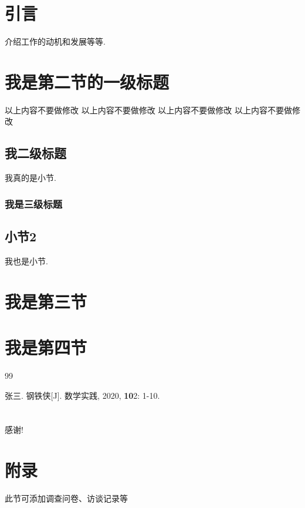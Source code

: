 \documentclass[a4paper,12pt,twoside]{ctexart}
\begin{document}
\newpage %
\pagestyle{empty}
\tableofcontents      %
\newpage %

\newpage
\section{引言}
    介绍工作的动机和发展等等.
\section{我是第二节的一级标题}
以上内容不要做修改 以上内容不要做修改 以上内容不要做修改 以上内容不要做修改
\subsection{我二级标题}
    我真的是小节.
\subsubsection{我是三级标题}
\subsection{小节2}
    我也是小节.

\section{我是第三节}
\section{我是第四节}
\newpage

\begin{thebibliography}{99}
\setlength{\itemsep}{-0.75ex}
张三. 钢铁侠[J]. 数学实践, 2020, \textbf{10}2: 1-10.
\end{thebibliography}
\newpage
\section*{}
感谢!
\newpage
\section*{附录}
此节可添加调查问卷、访谈记录等
\end{document}

